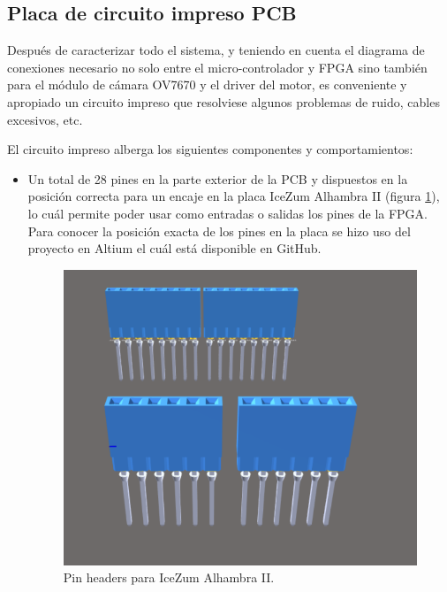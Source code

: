 \subsection{Placa de circuito impreso PCB}\label{sec:DisenoPCB} 
Después de caracterizar todo el sistema, y teniendo en cuenta el diagrama de conexiones necesario no solo entre el micro-controlador y FPGA sino también para el módulo de cámara OV7670 y el driver del motor, es conveniente y apropiado un circuito impreso que resolviese algunos problemas de ruido, cables excesivos, etc. \newline

El circuito impreso alberga los siguientes componentes y
comportamientos:

\begin{itemize}
	\item Un total de 28 pines en la parte exterior de la PCB y dispuestos en la posición correcta para un encaje en la placa IceZum Alhambra II (figura \ref{fig:pin_headers}), lo cuál permite poder usar como entradas o salidas los pines de la FPGA. Para conocer la posición exacta de los pines en la placa se hizo uso del proyecto en Altium el cuál está disponible en GitHub.
	
	\begin{figure}[H]
		\center
		\includegraphics[scale=0.5]{imagenes/Balancing_robot/pin_headers.PNG}
		\caption{Pin headers para IceZum Alhambra II.}
		\label{fig:pin_headers}
	\end{figure}
	

\end{itemize}
